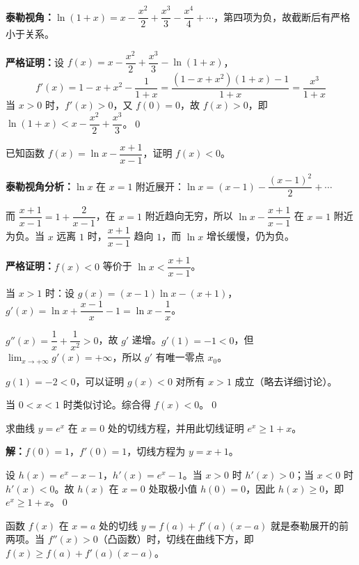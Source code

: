 \documentclass[12pt, a4paper]{ctexart}
\begin{document}
\textbf{泰勒视角：}$\ln(1+x) = x - \dfrac{x^2}{2} + \dfrac{x^3}{3} - \dfrac{x^4}{4} + \cdots$，第四项为负，故截断后有严格小于关系。

\textbf{严格证明：}设 $f(x) = x - \dfrac{x^2}{2} + \dfrac{x^3}{3} - \ln(1+x)$，
\[
f'(x) = 1 - x + x^2 - \frac{1}{1+x} = \frac{(1-x+x^2)(1+x) - 1}{1+x} = \frac{x^3}{1+x}
\]
当 $x > 0$ 时，$f'(x) > 0$，又 $f(0) = 0$，故 $f(x) > 0$，即 $\ln(1+x) < x - \dfrac{x^2}{2} + \dfrac{x^3}{3}$。\qed

\begin{examplebox}
已知函数 $f(x) = \ln x - \dfrac{x+1}{x-1}$，证明 $f(x) < 0$。
\end{examplebox}

\textbf{泰勒视角分析：}$\ln x$ 在 $x = 1$ 附近展开：$\ln x = (x-1) - \dfrac{(x-1)^2}{2} + \cdots$

而 $\dfrac{x+1}{x-1} = 1 + \dfrac{2}{x-1}$，在 $x = 1$ 附近趋向无穷，所以 $\ln x - \dfrac{x+1}{x-1}$ 在 $x = 1$ 附近为负。当 $x$ 远离 $1$ 时，$\dfrac{x+1}{x-1}$ 趋向 $1$，而 $\ln x$ 增长缓慢，仍为负。

\textbf{严格证明：}$f(x) < 0$ 等价于 $\ln x < \dfrac{x+1}{x-1}$。

当 $x > 1$ 时：设 $g(x) = (x-1)\ln x - (x+1)$，$g'(x) = \ln x + \dfrac{x-1}{x} - 1 = \ln x - \dfrac{1}{x}$。

$g''(x) = \dfrac{1}{x} + \dfrac{1}{x^2} > 0$，故 $g'$ 递增。$g'(1) = -1 < 0$，但 $\lim_{x \to +\infty} g'(x) = +\infty$，所以 $g'$ 有唯一零点 $x_0$。

$g(1) = -2 < 0$，可以证明 $g(x) < 0$ 对所有 $x > 1$ 成立（略去详细讨论）。

当 $0 < x < 1$ 时类似讨论。综合得 $f(x) < 0$。\qed

\begin{examplebox}[【例题6】泰勒视角秒杀切线问题]
求曲线 $y = e^x$ 在 $x = 0$ 处的切线方程，并用此切线证明 $e^x \geq 1 + x$。
\end{examplebox}

\textbf{解：}$f(0) = 1$，$f'(0) = 1$，切线方程为 $y = x + 1$。

设 $h(x) = e^x - x - 1$，$h'(x) = e^x - 1$。当 $x > 0$ 时 $h'(x) > 0$；当 $x < 0$ 时 $h'(x) < 0$。故 $h(x)$ 在 $x = 0$ 处取极小值 $h(0) = 0$，因此 $h(x) \geq 0$，即 $e^x \geq 1 + x$。\qed

\begin{tipbox}[切线放缩法]
函数 $f(x)$ 在 $x = a$ 处的切线 $y = f(a) + f'(a)(x-a)$ 就是泰勒展开的前两项。当 $f''(x) > 0$（凸函数）时，切线在曲线下方，即 $f(x) \geq f(a) + f'(a)(x-a)$。
\end{tipbox}
\end{document}
